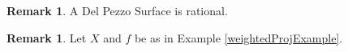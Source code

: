 \documentclass[12pt]{amsart}
\theoremstyle{plain}
\theoremstyle{definition}
\newtheorem{remark}[subsection]{Remark}
\begin{document}
	\begin{remark} A Del Pezzo Surface is rational. 
	\end{remark}
	
	\begin{remark} Let $X$ and $f$ be as in Example \ref{weightedProjExample}. 
	\end{remark}
	
	
	
	
	
	
	
	
	
	
	
	
	
\end{document}
